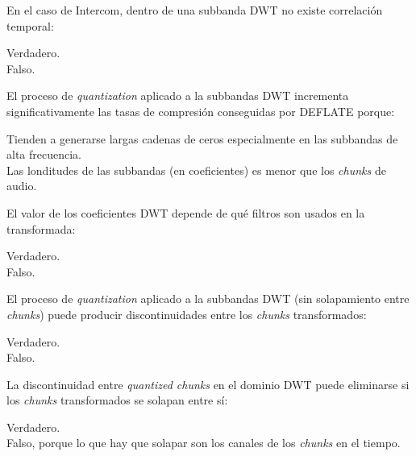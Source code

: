 \documentclass[legalpaper, 12pt, addpoints]{exam}
\begin{document}
\begin{questions}
\question En el caso de Intercom, dentro de una subbanda DWT no existe
correlación temporal:

\begin{oneparchoices}
  \choice Verdadero.\\
  \choice Falso.
\end{oneparchoices}
  
\vspace{0.10in}

\question El proceso de \emph{quantization} aplicado a la subbandas DWT
incrementa significativamente las tasas de compresión conseguidas por
DEFLATE porque:

\begin{oneparchoices}
  \choice Tienden a generarse largas cadenas de ceros especialmente en las subbandas de alta frecuencia.\\
  \choice Las londitudes de las subbandas (en coeficientes) es menor que los \emph{chunks} de audio.
\end{oneparchoices}
  
\vspace{0.10in}

\question El valor de los coeficientes DWT depende de qué filtros son
usados en la transformada:

\begin{oneparchoices}
  \choice Verdadero.\\
  \choice Falso.
\end{oneparchoices}
  
\vspace{0.10in}

\question El proceso de \emph{quantization} aplicado a la subbandas
DWT (sin solapamiento entre \emph{chunks}) puede producir
discontinuidades entre los \emph{chunks} transformados:

\begin{oneparchoices}
  \choice Verdadero.\\
  \choice Falso.
\end{oneparchoices}
  
\vspace{0.10in}

\question La discontinuidad entre \emph{quantized chunks} en el dominio
DWT puede eliminarse si los \emph{chunks} transformados se solapan entre sí:

\begin{oneparchoices}
  \choice Verdadero.\\
  \choice Falso, porque lo que hay que solapar son los canales de los \emph{chunks} en el tiempo.
\end{oneparchoices}
  

\end{questions}
\end{document}
